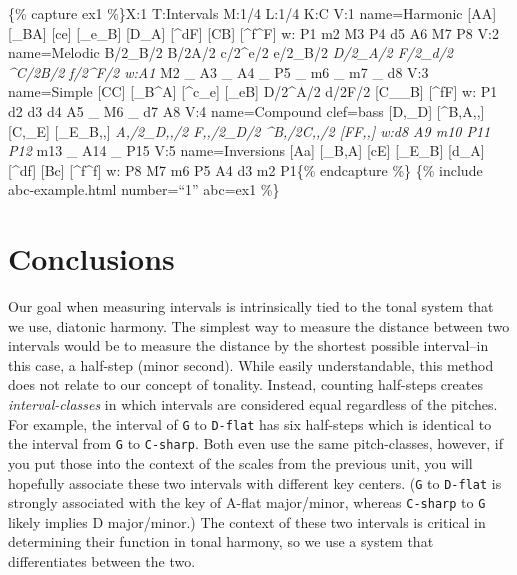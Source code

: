 \documentclass{book}
\begin{document}
\{\% capture ex1 \%\}X:1 T:Intervals M:1/4 L:1/4 K:C V:1 name=Harmonic
{[}AA{]}\textbar{} {[}\_BA{]}\textbar{} {[}ce{]}\textbar{}
{[}\_e\_B{]}\textbar{} {[}D\_A{]}\textbar{} {[}\^{}dF{]}\textbar{}
{[}CB{]}\textbar{} {[}\^{}f\^{}F{]}\textbar\textbar{} w: P1 m2 M3 P4 d5 A6 M7
P8 V:2 name=Melodic B/2\_B/2\textbar{} B/2A/2\textbar{} c/2\^{}e/2\textbar{}
e/2\_B/2\textbar{} \emph{D/2\_A/2\textbar{} F/2\_d/2\textbar{}
\^{}C/2B/2\textbar{} f/2\^{}F/2\textbar\textbar{} w:A1 } M2 \_ A3 \_ A4 \_ P5
\_ m6 \_ m7 \_ d8 V:3 name=Simple {[}CC{]}\textbar{} {[}\_B\^{}A{]}\textbar{}
{[}\^{}c\_e{]}\textbar{} {[}\_eB{]}\textbar{} D/2\^{}A/2\textbar{}
d/2F/2\textbar{} {[}C\_\_B{]}\textbar{} {[}\^{}fF{]}\textbar\textbar{} w: P1
d2 d3 d4 A5 \_ M6 \_ d7 A8 V:4 name=Compound clef=bass {[}D,\_D{]}\textbar{}
{[}\^{}B,A,,{]}\textbar{} {[}C,\_E{]}\textbar{} {[}\_E\_B,,{]}\textbar{}
\emph{A,/2\_D,,/2\textbar{} F,,/2\_D/2\textbar{} \^{}B,/2C,,/2\textbar{}
{[}FF,,{]}\textbar\textbar{} w:d8 A9 m10 P11 P12 } m13 \_ A14 \_
P15\textbar\textbar{} V:5 name=Inversions {[}Aa{]}\textbar{}
{[}\_B,A{]}\textbar{} {[}cE{]}\textbar{} {[}\_E\_B{]}\textbar{}
{[}d\_A{]}\textbar{} {[}\^{}df{]}\textbar{} {[}Bc{]}\textbar{}
{[}\^{}f\^{}f{]}\textbar\textbar{} w: P8 M7 m6 P5 A4 d3 m2 P1\{\% endcapture
\%\} \{\% include abc-example.html number=``1'' abc=ex1 \%\}

\hypertarget{conclusions-58}{%
\section{Conclusions}\label{conclusions-58}}

Our goal when measuring intervals is intrinsically tied to the tonal system
that we use, diatonic harmony. The simplest way to measure the distance
between two intervals would be to measure the distance by the shortest
possible interval--in this case, a half-step (minor second). While easily
understandable, this method does not relate to our concept of tonality.
Instead, counting half-steps creates \emph{interval-classes} in which
intervals are considered equal regardless of the pitches. For example, the
interval of \texttt{G} to \texttt{D-flat} has six half-steps which is
identical to the interval from \texttt{G} to \texttt{C-sharp}. Both even use
the same pitch-classes, however, if you put those into the context of the
scales from the previous unit, you will hopefully associate these two
intervals with different key centers. (\texttt{G} to \texttt{D-flat} is
strongly associated with the key of A-flat major/minor, whereas
\texttt{C-sharp} to \texttt{G} likely implies D major/minor.) The context of
these two intervals is critical in determining their function in tonal
harmony, so we use a system that differentiates between the two.
\end{document}
